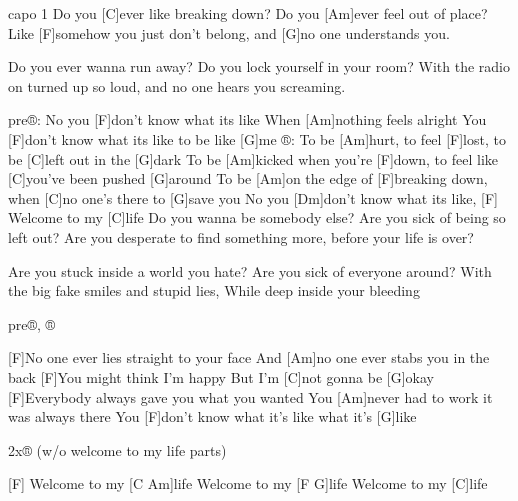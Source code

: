 
capo 1
Do you [C]ever like breaking down?
Do you [Am]ever feel out of place?
Like [F]somehow you just don't belong,
and [G]no one understands you.

Do you ever wanna run away?
Do you lock yourself in your room?
With the radio on turned up so loud,
and no one hears you screaming.

pre®: No you [F]don't know what its like
When [Am]nothing feels alright
You [F]don't know what its like to be like [G]me
®: To be [Am]hurt, to feel [F]lost, to be [C]left out in the [G]dark
To be [Am]kicked when you're [F]down, to feel like [C]you've been pushed [G]around
To be [Am]on the edge of [F]breaking down, when [C]no one's there to [G]save you
No you [Dm]don't know what its like, 
[F] Welcome to my [C]life \slpc
Do you wanna be somebody else?
Are you sick of being so left out?
Are you desperate to find something more,
before your life is over?

Are you stuck inside a world you hate?
Are you sick of everyone around?
With the big fake smiles and stupid lies,
While deep inside your bleeding

pre®, ® 

[F]No one ever lies straight to your face
And [Am]no one ever stabs you in the back
[F]You might think I'm happy
But I'm [C]not gonna be [G]okay
[F]Everybody always gave you what you wanted
You [Am]never had to work it was always there
You [F]don't know what it's like what it's [G]like

2x® (w/o welcome to my life parts)

[F] Welcome to my [C Am]life
Welcome to my [F G]life 
Welcome to my [C]life

